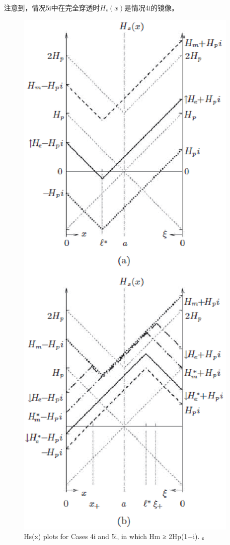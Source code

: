 注意到，情况5i中在完全穿透时$H_s(x)$是情况4i的镜像。
\begin{figure}[htbp]
	\centering
	\includegraphics[scale=0.7]{chpt7/figs/fig7.16.eps}
	\caption{Hs(x) plots for Cases 4i and
		5i, in which Hm ≥ 2Hp(1−i). 。}
\end{figure}



